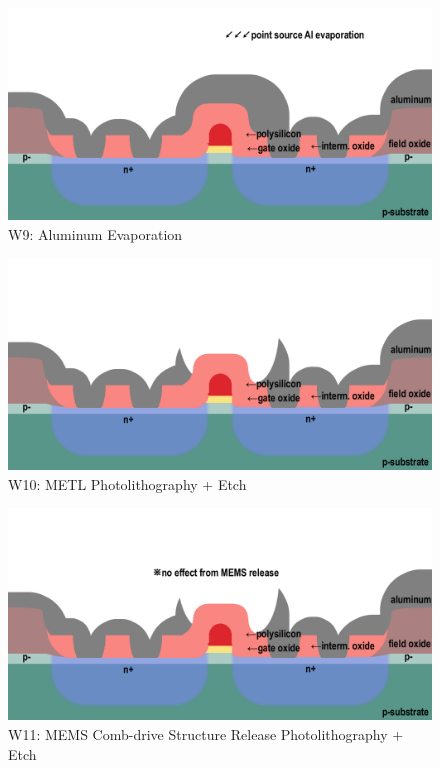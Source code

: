 \documentclass{article}
\begin{document}
\begin{figure}[H]
\centering
\includegraphics[width=350pt]{CrossSections/MOSFETlabprofiles/MOSFETw9note.png}
\caption{W9: Aluminum Evaporation}
\end{figure}
\begin{figure}[H]
\centering
\includegraphics[width=350pt]{CrossSections/MOSFETlabprofiles/MOSFETw10.png}
\caption{W10: METL Photolithography + Etch}
\end{figure}
\begin{figure}[H]
\centering
\includegraphics[width=350pt]{CrossSections/MOSFETlabprofiles/MOSFETw11note.png}
\caption{W11: MEMS Comb-drive Structure Release Photolithography + Etch}
\end{figure}
\end{document}
